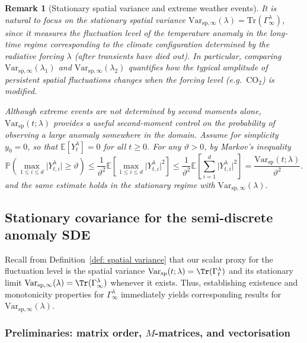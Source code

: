 \documentclass[10pt]{amsart}
\newtheorem{remark}[theorem]{Remark}
\numberwithin{equation}{section}
\begin{document}
\begin{remark}[Stationary spatial variance and extreme weather events] 
It is natural to focus on the \emph{stationary} spatial variance
$\mathrm{Var}_{\mathrm{sp},\infty}(\lambda)=\mathrm{Tr}(\Gamma_\infty^\lambda)$, since it measures the fluctuation level of the
temperature anomaly in the long-time regime corresponding to the \emph{climate configuration} determined by the
radiative forcing $\lambda$ (after transients have died out). In particular, comparing
$\mathrm{Var}_{\mathrm{sp},\infty}(\lambda_1)$ and $\mathrm{Var}_{\mathrm{sp},\infty} (\lambda_2)$ quantifies how the typical
amplitude of persistent spatial fluctuations changes when the forcing level (e.g.\ $\mathrm{CO}_2$) is modified.

Although extreme events are not determined by second moments alone, $\mathrm{Var}_{\mathrm{sp}}(t;\lambda)$ provides a
useful second-moment control on the probability of observing a large anomaly somewhere in the domain. Assume for simplicity $y_0=0$, so that $\mathbb{E}[Y_t^\lambda]=0$ for all $t\geq 0$.  For any
$\vartheta>0$, by Markov's inequality
$$
\mathbb{P}\left( \max_{ 1 \leq i \leq d}  \vert Y_{t,i}^\lambda  \vert  \geq \vartheta \right) \leq \frac{1}{\vartheta ^2} \mathbb{E}\left[ \max_{ 1 \leq i \leq d} \vert Y_{t,i}^\lambda \vert ^2\right] \leq \frac{1}{\vartheta^2} \mathbb{E}\left[ \sum_{ i = 1}^d \vert  Y_{t,i}^\lambda \vert^2 \right] = \frac{\mathrm{Var}_{\mathrm{sp}}(t;\lambda)}{\vartheta ^2}.
$$
and the same estimate holds in the stationary regime with $\mathrm{Var}_{\mathrm{sp},\infty}(\lambda)$.
\end{remark}

\subsection{Stationary covariance for the semi-discrete anomaly SDE}
\label{subsec: Stationary covariance for the semi-discrete anomaly SDE}
Recall from Definition~\ref{def: spatial variance} that our scalar proxy for the fluctuation level is the spatial variance $\mathrm{Var}_{\mathrm{sp}}(t;\lambda)=\Tr(\Gamma_t^\lambda)$ and its stationary limit $\mathrm{Var}_{\mathrm{sp},\infty}(\lambda)=\Tr(\Gamma_\infty^\lambda)$ whenever it exists. Thus, establishing existence and monotonicity properties for $\Gamma_\infty^\lambda$ immediately yields corresponding results for $\mathrm{Var}_{\mathrm{sp},\infty}(\lambda)$.
\subsubsection{Preliminaries: matrix order, $M$-matrices, and vectorisation}
\label{subsec: preliminaries matrices}
\end{document}
